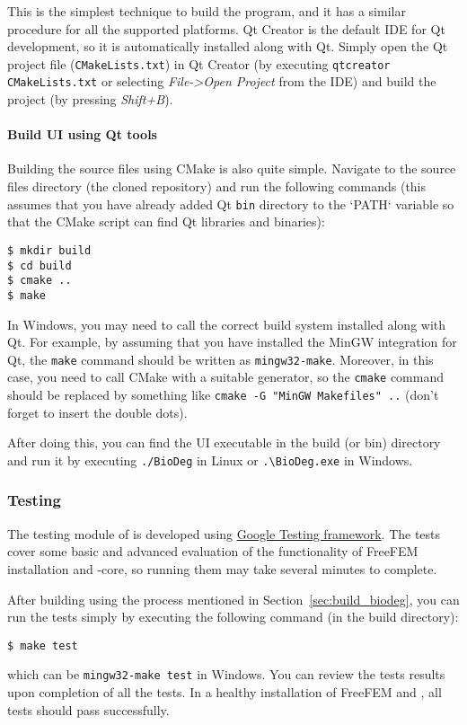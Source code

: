 This is the simplest technique to build the program, and it has a similar procedure for all the supported platforms. Qt Creator is the default IDE for Qt development, so it is automatically installed along with Qt. Simply open the Qt project file (\verb|CMakeLists.txt|) in Qt Creator (by executing \verb|qtcreator CMakeLists.txt| or selecting \textit{File->Open Project} from the IDE) and build the project (by pressing \textit{Shift+B}).

\paragraph{Build \biodeg{} UI using Qt tools}

Building the source files using CMake is also quite simple. Navigate to the source files directory (the cloned repository) and run the following commands (this assumes that you have already added Qt \verb|bin| directory to the `PATH` variable so that the CMake script can find Qt libraries and binaries):

\begin{verbatim}
$ mkdir build
$ cd build
$ cmake ..
$ make
\end{verbatim}

In Windows, you may need to call the correct build system installed along with Qt. For example, by assuming that you have installed the MinGW integration for Qt, the \verb|make| command should be written as \verb|mingw32-make|. Moreover, in this case, you need to call CMake with a suitable generator, so the \verb|cmake| command should be replaced by something like \verb|cmake -G "MinGW Makefiles" ..| (don't forget to insert the double dots).

After doing this, you can find the \biodeg{} UI executable in the build (or bin) directory and run it by executing \verb|./BioDeg| in Linux or \verb|.\BioDeg.exe| in Windows.

\subsubsection{Testing \biodeg{}}

The testing module of \biodeg{} is developed using \href{https://github.com/google/googletest}{Google Testing framework}. The tests cover some basic and advanced evaluation of the functionality of FreeFEM installation and \biodeg{}-core, so running them may take several minutes to complete. 

After building \biodeg{} using the process mentioned in Section~\ref{sec:build_biodeg}, you can run the tests simply by executing the following command (in the build directory):

\begin{verbatim}
$ make test
\end{verbatim}
which can be \verb|mingw32-make test| in Windows. You can review the tests results upon completion of all the tests. In a healthy installation of FreeFEM and \biodeg{}, all tests should pass successfully. 